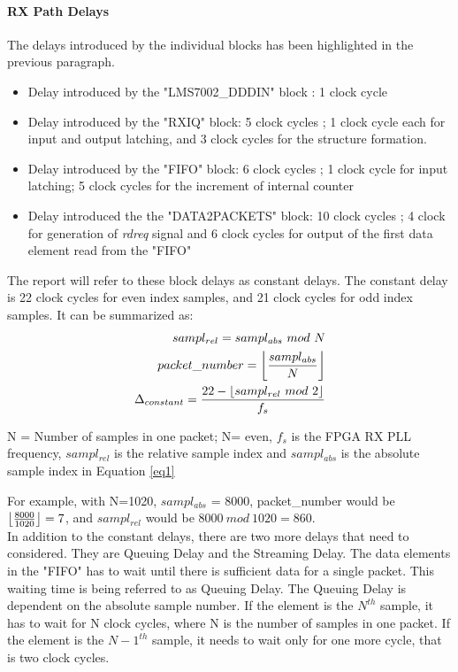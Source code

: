 \paragraph{RX Path Delays}
The delays introduced by the individual blocks has been highlighted in the previous paragraph.
\begin{itemize}
\item{Delay introduced by the "LMS7002\_DDDIN" block : 1 clock cycle}
\item{Delay introduced by the "RXIQ" block: 5 clock cycles ; 1 clock cycle each for input and output latching, and 3 clock cycles for the structure formation.}
\item{Delay introduced by the "FIFO" block: 6 clock cycles ; 1 clock cycle for input latching; 5 clock cycles for the increment of internal counter}
\item{Delay introduced the the "DATA2PACKETS" block: 10 clock cycles ; 4 clock for generation of \textit{rdreq} signal and 6 clock cycles for output of the first data element read from the "FIFO"}
\end{itemize}

The report will refer to these block delays as constant delays.
The constant delay is 22 clock cycles for even index samples, and 21 clock cycles for odd index samples. It can be summarized as:\\

\begin{subequations} \label{eq1}
\begin{align}
	sampl_{rel} = sampl_{abs} \ mod \ N \label{eq1.1}\\ 
  packet\_number= \floor*{\frac{sampl_{abs}}{N}} \label{eq1.2}\\
  \Delta_{constant} = \frac{22 - \floor*{sampl_{rel} \ mod \ 2 }}{f_s} \label{eq1.3}
\end{align}
  
\end{subequations}

N = Number of samples in one packet; N= even, $f_s$ is the \ac{FPGA} RX PLL frequency, $sampl_{rel}$ is the relative sample index and $sampl_{abs}$ is the absolute sample index in Equation \ref{eq1}

For example, with N=1020, $sampl_{abs}$ = 8000, packet\_number would be $\floor*{\frac{8000}{1020}} = 7$, and $sampl_{rel}$ would be  $8000 \ mod \ 1020 = 860$. \\
 
In addition to the constant delays, there are two more delays that need to considered.
They are Queuing Delay and the Streaming Delay.
The data elements in the "FIFO" has to wait until there is sufficient data for a single packet.
This waiting time is being referred to as Queuing Delay.
The Queuing Delay is dependent on the absolute sample number.
If the element is the $N^{th}$ sample, it has to wait for N clock cycles, where N is the number of samples in one packet.
If the element is the $N-1^{th}$ sample, it needs to wait only for one more cycle, that is two clock cycles.

